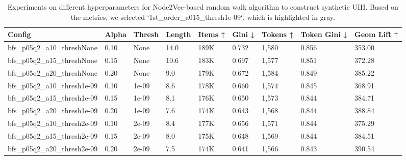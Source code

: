 \documentclass[]{fairmeta}
\begin{document}
\begin{table}[]
\caption{Experiments on different hyperparameters for Node2Vec-based random walk algorithm to construct synthetic UIH. Based on the metrics, we selected `1st\_order\_a015\_thresh1e-09`, which is highlighted in gray.}
\begin{tabular}{lllllllll}
\toprule
\textbf{Config}                 & \textbf{Alpha} & \textbf{Thresh} & \textbf{Length} & \textbf{Items ↑} & \textbf{Gini ↓} & \textbf{Tokens ↑} & \textbf{Token Gini ↓} & \textbf{Geom Lift ↑} \\
\midrule
 bfs\_p05q2\_a10\_threshNone   & 0.10           & None            & 14.0            & 189K             & 0.732           & 1,580             & 0.856                 & 353.00               \\
 bfs\_p05q2\_a15\_threshNone   & 0.15           & None            & 10.6            & 183K             & 0.697           & 1,577             & 0.851                 & 372.28               \\
 bfs\_p05q2\_a20\_threshNone   & 0.20           & None            & 9.0             & 179K             & 0.672           & 1,584             & 0.849                 & 385.22               \\
 bfs\_p05q2\_a10\_thresh1e-09  & 0.10           & 1e-09           & 8.6             & 178K             & 0.660           & 1,574             & 0.845                 & 368.91               \\
 bfs\_p05q2\_a15\_thresh1e-09  & 0.15           & 1e-09           & 8.1             & 176K             & 0.650           & 1,573             & 0.844                 & 384.71               \\
 bfs\_p05q2\_a20\_thresh1e-09  & 0.20           & 1e-09           & 7.6             & 174K             & 0.643           & 1,568             & 0.844                 & 388.84               \\
 bfs\_p05q2\_a10\_thresh2e-09  & 0.10           & 2e-09           & 8.4             & 177K             & 0.656           & 1,571             & 0.844                 & 375.29               \\
 bfs\_p05q2\_a15\_thresh2e-09  & 0.15           & 2e-09           & 8.0             & 175K             & 0.648           & 1,569             & 0.844                 & 384.51               \\
 bfs\_p05q2\_a20\_thresh2e-09  & 0.20           & 2e-09           & 7.5             & 174K             & 0.641           & 1,566             & 0.843                 & 390.54               \\

\end{tabular}
\end{table}
\end{document}
